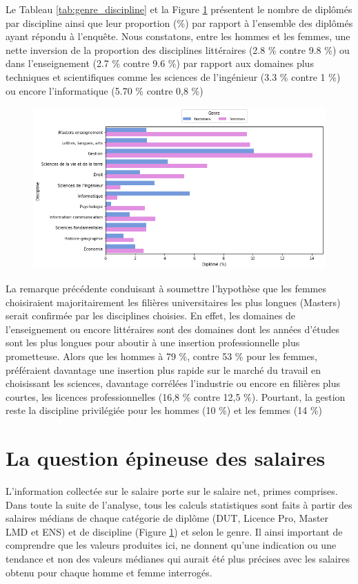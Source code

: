 \documentclass[12pt, a4paper, titlepage, table]{article}
\begin{document}
	
	Le Tableau \ref{tab:genre_discipline} et la Figure \ref{fig:genre_discipline} présentent le nombre de diplômés par discipline ainsi que leur proportion (\%) par rapport à l'ensemble des diplômés ayant répondu à l'enquête.
	Nous constatons, entre les hommes et les femmes,  une nette inversion de la proportion des disciplines  littéraires (2.8 \% contre 9.8 \%) ou dans l'enseignement (2.7 \% contre 9.6 \%) par rapport aux domaines plus techniques et scientifiques comme les sciences de l'ingénieur (3.3 \% contre 1 \%) ou encore l'informatique (5.70 \% contre 0,8 \%)

	\begin{figure}[H]
		\centering
		\includegraphics[width=1\textwidth]{../graphs/proportion_disciplines.png}
		\label{fig:genre_discipline}
	\end{figure}

	La remarque précédente conduisant à soumettre l'hypothèse que les femmes choisiraient majoritairement les filières universitaires les plus longues (Masters) serait confirmée par les disciplines choisies.
	En effet, les domaines de l'enseignement ou encore littéraires sont des domaines dont les années d'études sont les plus longues pour aboutir à une insertion professionnelle plus prometteuse.
	Alors que les hommes à 79 \%, contre  53 \% pour les femmes,  préféraient davantage une insertion plus rapide sur le marché du travail en choisissant les sciences, davantage corrélées l'industrie ou encore en filières plus courtes, les licences professionnelles (16,8 \% contre 12,5 \%). Pourtant, la gestion reste la discipline privilégiée pour les hommes (10 \%) et les femmes (14 \%) 


\section{La question épineuse des salaires}
L’information collectée sur le salaire porte sur le salaire net, primes comprises. Dans toute la suite de l'analyse, tous les calculs statistiques sont faits à partir des salaires médians de chaque catégorie de diplôme (DUT, Licence Pro, Master LMD et ENS) et de discipline (Figure \ref{fig:genre_discipline}) et selon le genre. Il ainsi important de comprendre que les valeurs produites ici,  ne donnent qu'une indication ou une tendance et non des valeurs médianes qui aurait été plus précises avec les salaires obtenu pour chaque homme et femme interrogés.
 
\end{document}
